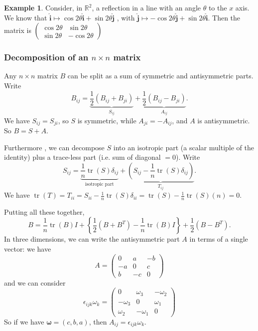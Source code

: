 \documentclass[a4paper]{article}
\theoremstyle{definition}
\newtheorem*{eg}{Example}
\newcommand{\mb}[1]{\mathbf{#1}}
\newcommand{\R}{\mathbb{R}}
\DeclareMathOperator\tr{tr}
\begin{document}
\begin{eg}
  Consider, in $\R^2$, a reflection in a line with an angle $\theta$ to the $x$ axis. We know that $\mb{\hat{i}}\mapsto \cos 2\theta \mb{\hat{i}} + \sin 2\theta\mb{\hat j}$ , with $\mb{\hat{j}}\mapsto -\cos 2\theta \mb{\hat{j}} + \sin 2\theta\mb{\hat i}$. Then the matrix is
$\begin{pmatrix}
    \cos 2\theta & \sin 2\theta\\
    \sin 2\theta & -\cos 2\theta
  \end{pmatrix}$
\end{eg}

\subsubsection{Decomposition of an \texorpdfstring{$n\times n$}{n x n} matrix}
  Any $n\times n$ matrix $B$ can be split as a sum of symmetric and antisymmetric parts. Write
\[
B_{ij} = \underbrace{\frac{1}{2}(B_{ij} + B_{ji})}_{S_{ij}} + \underbrace{\frac{1}{2}(B_{ij} - B_{ji})}_{A_{ij}}.
\]
We have $S_{ij} = S_{ji}$, so $S$ is symmetric, while $A_{ji} = -A_{ij}$, and $A$ is antisymmetric. So $B = S + A$.

Furthermore , we can decompose $S$ into an isotropic part (a scalar multiple of the identity) plus a trace-less part (i.e. sum of diagonal $= 0$). Write
\[
S_{ij} = \underbrace{\frac{1}{n}\tr (S)\delta_{ij}}_{\text{isotropic part}} + \underbrace{(S_{ij} - \frac{1}{n}\tr(S)\delta_{ij})}_{T_{ij}}.
\]
We have $\tr(T) = T_{ii} = S_{ii} - \frac{1}{n}\tr(S)\delta_{ii} = \tr(S) - \frac{1}{n}\tr(S)(n) = 0$.

Putting all these together,
\[
B = \frac{1}{n}\tr(B)I + \left\{\frac{1}{2}(B + B^T) - \frac{1}{n}\tr(B)I\right\} + \frac{1}{2}(B - B^T).
\]
In three dimensions, we can write the antisymmetric part $A$ in terms of a single vector: we have
\[
A = \begin{pmatrix}
  0 & a & -b\\
  -a & 0 & c\\
  b & -c & 0
\end{pmatrix}
\]
and we can consider
\[
\epsilon_{ijk}\omega_k =
\begin{pmatrix}
  0 & \omega_3 & -\omega_2\\
  -\omega_3 & 0 & \omega_1\\
  \omega_2 & -\omega_1 & 0
\end{pmatrix}
\]
So if we have $\mb{\omega} = (c, b, a)$, then $A_{ij} = \epsilon_{ijk}\omega_k$.
\end{document}
